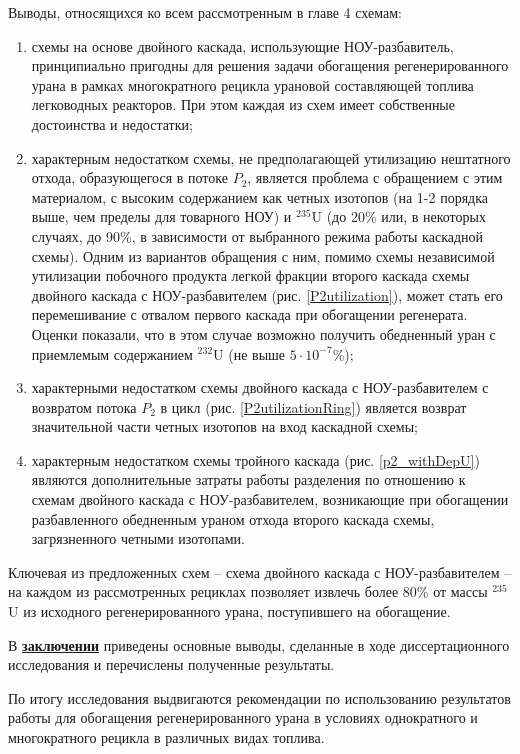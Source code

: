 Выводы, относящихся ко всем рассмотренным в главе 4 схемам:
\begin{enumerate}
    \item схемы на основе двойного каскада, использующие НОУ-разбавитель, принципиально пригодны для решения задачи обогащения регенерированного урана в рамках многократного рецикла урановой составляющей топлива легководных реакторов. При этом каждая из схем имеет собственные достоинства и недостатки;
    \item характерным недостатком схемы, не предполагающей утилизацию нештатного отхода, образующегося в потоке $P_2$, является проблема с обращением с этим материалом, с высоким содержанием как четных изотопов (на 1-2 порядка выше, чем пределы для товарного НОУ) и $^{235}$U (до 20\% или, в некоторых случаях, до 90\%, в зависимости от выбранного режима работы каскадной схемы). Одним из вариантов обращения с ним, помимо схемы независимой утилизации побочного продукта легкой фракции второго каскада схемы двойного каскада с НОУ-разбавителем (рис. \ref{P2utilization}), может стать его перемешивание с отвалом первого каскада при обогащении регенерата. Оценки показали, что в этом случае возможно получить обедненный уран с приемлемым содержанием $^{232}$U (не выше $5\cdot10^{-7}$\%);
    \item характерными недостатком схемы двойного каскада с НОУ-разбавителем с возвратом потока $P_2$ в цикл (рис. \ref{P2utilizationRing}) является возврат значительной части четных изотопов на вход каскадной схемы;
    \item характерным недостатком схемы тройного каскада (рис. \ref{p2_withDepU}) являются дополнительные затраты работы разделения по отношению к схемам двойного каскада с НОУ-разбавителем, возникающие при обогащении разбавленного обедненным ураном отхода второго каскада схемы, загрязненного четными изотопами.
\end{enumerate}

Ключевая из предложенных схем -- схема двойного каскада с НОУ-разбавителем -- на каждом из рассмотренных рециклах позволяет извлечь более 80\% от массы $^{235}$U из исходного регенерированного урана, поступившего на обогащение.

В \underline{\textbf{заключении}} приведены основные выводы, сделанные в ходе диссертационного исследования и перечислены полученные результаты.

По итогу исследования выдвигаются рекомендации по использованию результатов работы для обогащения регенерированного урана в условиях однократного и многократного рецикла в различных видах топлива.


